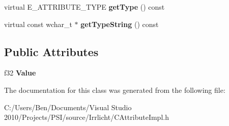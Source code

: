 \begin{DoxyCompactItemize}
\item 
\hypertarget{classirr_1_1io_1_1_c_float_attribute_ab415f0531bd564eba12ce43b35529330}{virtual E\-\_\-\-A\-T\-T\-R\-I\-B\-U\-T\-E\-\_\-\-T\-Y\-P\-E {\bfseries get\-Type} () const }\label{classirr_1_1io_1_1_c_float_attribute_ab415f0531bd564eba12ce43b35529330}

\item 
\hypertarget{classirr_1_1io_1_1_c_float_attribute_a63d497ec68dd03817fb1d18191a3285d}{virtual const wchar\-\_\-t $\ast$ {\bfseries get\-Type\-String} () const }\label{classirr_1_1io_1_1_c_float_attribute_a63d497ec68dd03817fb1d18191a3285d}

\end{DoxyCompactItemize}
\subsection*{Public Attributes}
\begin{DoxyCompactItemize}
\item 
\hypertarget{classirr_1_1io_1_1_c_float_attribute_a4ea0fe1e5a0502268b35f86fdffce82e}{f32 {\bfseries Value}}\label{classirr_1_1io_1_1_c_float_attribute_a4ea0fe1e5a0502268b35f86fdffce82e}

\end{DoxyCompactItemize}


The documentation for this class was generated from the following file\-:\begin{DoxyCompactItemize}
\item 
C\-:/\-Users/\-Ben/\-Documents/\-Visual Studio 2010/\-Projects/\-P\-S\-I/source/\-Irrlicht/C\-Attribute\-Impl.\-h\end{DoxyCompactItemize}
